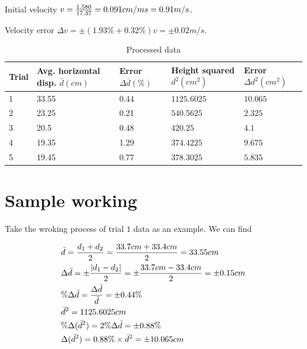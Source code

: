 \documentclass[a4paper]{article}
\begin{document}
Initial velocity $v = {1.580 \over 17.37} = 0.091 cm/ms = 0.91m/s$.

Velocity error $\Delta v =\pm (1.93\% + 0.32\%) v =\pm 0.02m/s$.

\begin{table}[h]
    \centering
    \begin{tabular}{lllll}
    \hline
    \textbf{Trial} & \textbf{Avg. horizontal disp. $\bar{d} (cm)$} & \textbf{Error $\Delta \bar{d} (\%)$} & \textbf{Height squared $d^2(cm^2)$} & \textbf{Error $\Delta d^2(cm^2)$} \\ \hline
    1              & 33.55                             & 0.44                                 & $1125.6025$                         & $10.065$                        \\
    2              & 23.25                             & 0.21                                 & $540.5625$                          & $2.325$                         \\
    3              & 20.5                              & 0.48                                 & $420.25$                            & $4.1$                           \\
    4              & 19.35                             & 1.29                                 & $374.4225$                          & $9.675$                         \\
    5              & 19.45                             & 0.77                                 & $378.3025$                          & $5.835$                         \\ \hline
    \end{tabular}
    \caption{Processed data}
\end{table}

\section{Sample working}

Take the wroking process of trial $1$ data as an example. We can find 

\begin{equation}
    \begin{aligned}
        &\bar{d} = {{d_1 + d_2} \over 2} = {{33.7cm + 33.4cm} \over 2} = 33.55cm \\
        &\Delta\bar{d} = \pm{{|d_1 - d_2|}\over 2} = \pm{{33.7cm - 33.4cm} \over 2} = \pm0.15cm \\
        &\%\Delta\bar{d} = {{\Delta\bar{d}}\over \bar{d}} = \pm 0.44\%  \\
        &\bar{d} ^2 = 1125.6025cm \\
        &\%\Delta(\bar{d}^2) = 2\%\Delta\bar{d} = \pm 0.88\% \\
        &\Delta(\bar{d}^2) = 0.88\% \times \bar{d} ^2 = \pm 10.065cm
    \end{aligned}
\end{equation}
\end{document}
